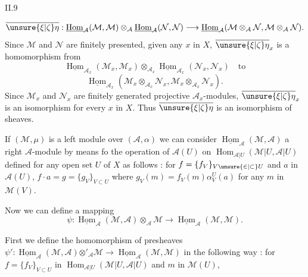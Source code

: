 
II.9

\[
\overline{\unsure{\xi|\zeta}\eta}:\underline{\operatorname{Hom}}_{\mathcal A}(\mathcal M,\mathcal M)\otimes_{\mathcal A}\underline{\operatorname{Hom}}_{\mathcal A}(\mathcal N,\mathcal N)\longrightarrow\underline{\operatorname{Hom}}_{\mathcal A}(\mathcal M\otimes_{\mathcal A}\mathcal N,\mathcal M\otimes_{\mathcal A}\mathcal N).
\]
Since $\mathcal M$ and $\mathcal N$ are finitely presented, given any $x$ in $X$, $\overline{\unsure{\xi|\zeta}\eta}_x$ is
a homomorphism from
\[
\underline{\operatorname{Hom}}_{\mathcal A_x}(\mathcal M_x,\mathcal M_x)\otimes_{\mathcal A_x}\underline{\operatorname{Hom}}_{\mathcal A_x}(\mathcal N_x,\mathcal N_x)\quad\text{to}
\]
\[
\underline{\operatorname{Hom}}_{\mathcal A_x}(\mathcal M_x\otimes_{\mathcal A_x}\mathcal N_x,\mathcal M_x\otimes_{\mathcal A_x}\mathcal N_x).
\]
Since $\mathcal M_x$ and $\mathcal N_x$ are finitely generated projective $\mathcal A_x$-modules,
$\overline{\unsure{\xi|\zeta}\eta}_x$ is an isomorphism for every $x$ in $X$. Thus $\overline{\unsure{\xi|\zeta}\eta}$ is an isomorphism of sheaves.

If $(\mathcal M,\mu)$ is a left module over $(\mathcal A,\alpha)$ we can consider
$\underline{\operatorname{Hom}}_{\mathcal A}(\mathcal M,\mathcal A)$ a right $\mathcal A$-module by means fo the operation of
$\mathcal A(U)$ on $\operatorname{Hom}_{\mathcal A|U}(\mathcal M|U,\mathcal A|U)$ defined for any open set $U$ of $X$
as follows : for $f=\{f_V\}_{V\unsure{\in|\subset}U}$ and $a$ in $\mathcal A(U)$, $f\cdot a=g=\{g_V\}_{V\subset U}$
where $g_V(m)=f_V(m)\alpha_V^U(a)$ for any $m$ in $\mathcal M(V)$.

Now we can define a mapping
\[
\psi:\underline{\operatorname{Hom}}_{\mathcal A}(\mathcal M,\mathcal A)\otimes_{\mathcal A}\mathcal M\longrightarrow\underline{\operatorname{Hom}}_{\mathcal A}(\mathcal M,\mathcal M).
\]

First we define the homomorphism of presheaves
$\psi':\underline{\operatorname{Hom}}_{\mathcal A}(\mathcal M,\mathcal A)\mathbin{\otimes'_{\mathcal A}}\mathcal M\longrightarrow\underline{\operatorname{Hom}}_{\mathcal A}(\mathcal M,\mathcal M)$ in the following way : for
$f=\{f_V\}_{V\subset U}$ in $\operatorname{Hom}_{\mathcal A|U}(\mathcal M|U,\mathcal A|U)$ and $m$ in $\mathcal M(U)$,
